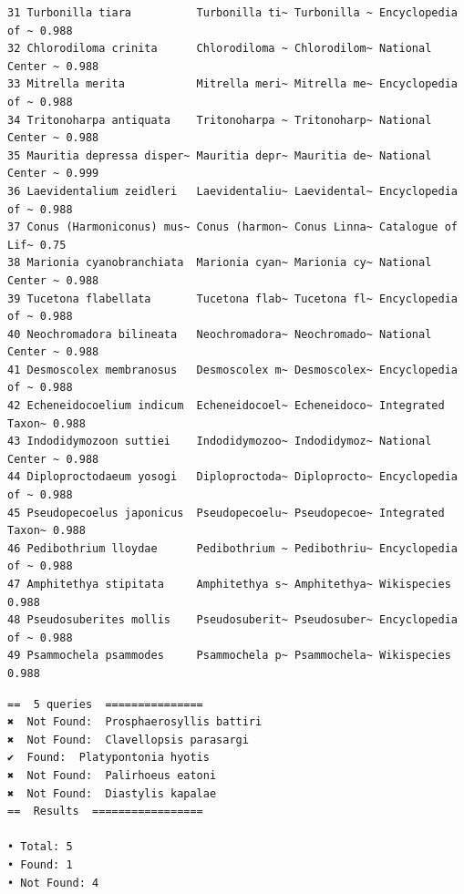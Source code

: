 \documentclass[
  letterpaper,
  DIV=11,
  numbers=noendperiod,
  oneside]{scrreprt}
\newenvironment{Shaded}{\begin{snugshade}}{\end{snugshade}}
\newcommand{\CommentTok}[1]{\textcolor[rgb]{0.37,0.37,0.37}{#1}}
\newcommand{\DecValTok}[1]{\textcolor[rgb]{0.68,0.00,0.00}{#1}}
\newcommand{\FunctionTok}[1]{\textcolor[rgb]{0.28,0.35,0.67}{#1}}
\newcommand{\NormalTok}[1]{\textcolor[rgb]{0.00,0.23,0.31}{#1}}
\newcommand{\OtherTok}[1]{\textcolor[rgb]{0.00,0.23,0.31}{#1}}
\newcommand{\SpecialCharTok}[1]{\textcolor[rgb]{0.37,0.37,0.37}{#1}}
\begin{document}
\begin{verbatim}
31 Turbonilla tiara          Turbonilla ti~ Turbonilla ~ Encyclopedia of ~ 0.988
32 Chlorodiloma crinita      Chlorodiloma ~ Chlorodilom~ National Center ~ 0.988
33 Mitrella merita           Mitrella meri~ Mitrella me~ Encyclopedia of ~ 0.988
34 Tritonoharpa antiquata    Tritonoharpa ~ Tritonoharp~ National Center ~ 0.988
35 Mauritia depressa disper~ Mauritia depr~ Mauritia de~ National Center ~ 0.999
36 Laevidentalium zeidleri   Laevidentaliu~ Laevidental~ Encyclopedia of ~ 0.988
37 Conus (Harmoniconus) mus~ Conus (harmon~ Conus Linna~ Catalogue of Lif~ 0.75 
38 Marionia cyanobranchiata  Marionia cyan~ Marionia cy~ National Center ~ 0.988
39 Tucetona flabellata       Tucetona flab~ Tucetona fl~ Encyclopedia of ~ 0.988
40 Neochromadora bilineata   Neochromadora~ Neochromado~ National Center ~ 0.988
41 Desmoscolex membranosus   Desmoscolex m~ Desmoscolex~ Encyclopedia of ~ 0.988
42 Echeneidocoelium indicum  Echeneidocoel~ Echeneidoco~ Integrated Taxon~ 0.988
43 Indodidymozoon suttiei    Indodidymozoo~ Indodidymoz~ National Center ~ 0.988
44 Diploproctodaeum yosogi   Diploproctoda~ Diploprocto~ Encyclopedia of ~ 0.988
45 Pseudopecoelus japonicus  Pseudopecoelu~ Pseudopecoe~ Integrated Taxon~ 0.988
46 Pedibothrium lloydae      Pedibothrium ~ Pedibothriu~ Encyclopedia of ~ 0.988
47 Amphitethya stipitata     Amphitethya s~ Amphitethya~ Wikispecies       0.988
48 Pseudosuberites mollis    Pseudosuberit~ Pseudosuber~ Encyclopedia of ~ 0.988
49 Psammochela psammodes     Psammochela p~ Psammochela~ Wikispecies       0.988
\end{verbatim}

\begin{Shaded}
\end{Shaded}

\begin{verbatim}
==  5 queries  ===============
✖  Not Found:  Prosphaerosyllis battiri
✖  Not Found:  Clavellopsis parasargi
✔  Found:  Platypontonia hyotis
✖  Not Found:  Palirhoeus eatoni
✖  Not Found:  Diastylis kapalae
==  Results  =================

• Total: 5 
• Found: 1 
• Not Found: 4
\end{verbatim}
\end{document}
